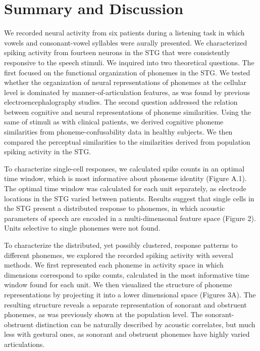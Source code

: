 \section{Summary and Discussion}
We recorded neural activity from six patients during a listening task in which vowels and consonant-vowel syllables were aurally presented. We characterized spiking activity from fourteen neurons in the STG that were consistently responsive to the speech stimuli. We inquired into two theoretical questions. The first focused on the functional organization of phonemes in the STG. We tested whether the organization of neural representations of phonemes at the cellular level is dominated by manner-of-articulation features, as was found by previous electroencephalography studies. The second question addressed the relation between cognitive and neural representations of phoneme similarities. Using the same of stimuli as with clinical patients, we derived cognitive phoneme similarities from phoneme-confusability data in healthy subjects. We then compared the perceptual similarities to the similarities derived from population spiking activity in the STG.

To characterize single-cell responses, we calculated spike counts in an optimal time window, which is most informative about phoneme identity (Figure A.1). The optimal time window was calculated for each unit separately, as electrode locations in the STG varied between patients. Results suggest that single cells in the STG present a distributed response to phonemes, in which acoustic parameters of speech are encoded in a multi-dimensonal feature space (Figure 2). Units selective to single phonemes were not found. 

To characterize the distributed, yet possibly clustered, response patterns to different phonemes, we explored the recorded spiking activity with several methods. We first represented each phoneme in activity space in which dimensions correspond to spike counts, calculated in the most informative time window found for each unit. We then visualized the structure of phoneme representations by projecting it into a lower dimensional space (Figures 3A). The resulting structure reveals a separate representation of sonorant and obstruent phonemes, as was previously shown at the population level. The sonorant-obstruent distinction can be naturally described by acoustic correlates, but much less with gestural ones, as sonorant and obstruent phonemes have highly varied articulations.   

